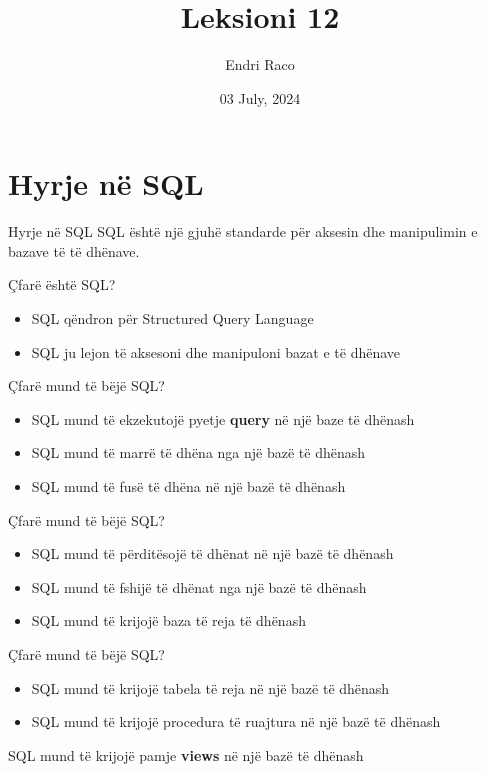 \documentclass[
  ignorenonframetext,
]{beamer}
\title{Leksioni 12}
\author{Endri Raco}
\date{03 July, 2024}
\begin{document}
\frame{\titlepage}

\begin{frame}[allowframebreaks]
  \tableofcontents[hideallsubsections]
\end{frame}
\section{Hyrje në SQL}\label{hyrje-nuxeb-sql}

\begin{frame}{Hyrje në SQL}
\label{hyrje-nuxeb-sql-1}
SQL është një gjuhë standarde për aksesin dhe manipulimin e bazave të të
dhënave.
\end{frame}

\begin{frame}{Çfarë është SQL?}
\label{uxe7faruxeb-uxebshtuxeb-sql}
\begin{itemize}
\item
  SQL qëndron për Structured Query Language
\item
  SQL ju lejon të aksesoni dhe manipuloni bazat e të dhënave
\end{itemize}
\end{frame}

\begin{frame}{Çfarë mund të bëjë SQL?}
\label{uxe7faruxeb-mund-tuxeb-buxebjuxeb-sql}
\begin{itemize}
\item
  SQL mund të ekzekutojë pyetje \textbf{query} në një baze të dhënash
\item
  SQL mund të marrë të dhëna nga një bazë të dhënash
\item
  SQL mund të fusë të dhëna në një bazë të dhënash
\end{itemize}
\end{frame}

\begin{frame}{Çfarë mund të bëjë SQL?}
\label{uxe7faruxeb-mund-tuxeb-buxebjuxeb-sql-1}
\begin{itemize}
\item
  SQL mund të përditësojë të dhënat në një bazë të dhënash
\item
  SQL mund të fshijë të dhënat nga një bazë të dhënash
\item
  SQL mund të krijojë baza të reja të dhënash
\end{itemize}
\end{frame}

\begin{frame}{Çfarë mund të bëjë SQL?}
\label{uxe7faruxeb-mund-tuxeb-buxebjuxeb-sql-2}
\begin{itemize}
\item
  SQL mund të krijojë tabela të reja në një bazë të dhënash
\item
  SQL mund të krijojë procedura të ruajtura në një bazë të dhënash
\end{itemize}

SQL mund të krijojë pamje \textbf{views} në një bazë të dhënash
\end{frame}
\end{document}
